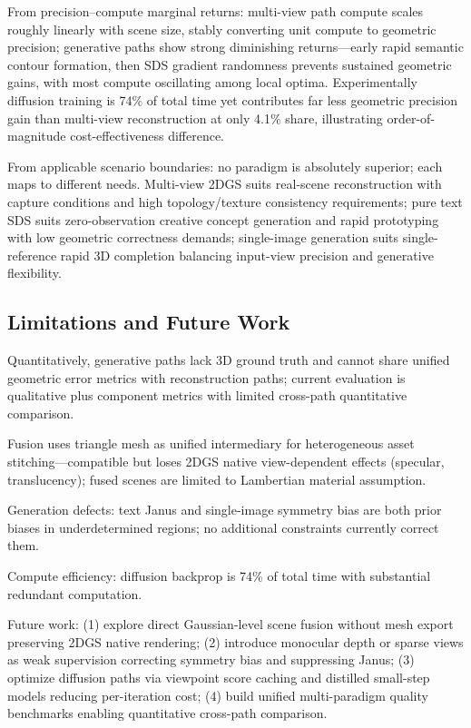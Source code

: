 \documentclass[10pt,twocolumn,letterpaper]{article}
\begin{document}
From precision--compute marginal returns: multi-view path compute scales roughly linearly with scene size, stably converting unit compute to geometric precision; generative paths show strong diminishing returns---early rapid semantic contour formation, then SDS gradient randomness prevents sustained geometric gains, with most compute oscillating among local optima. Experimentally diffusion training is 74\% of total time yet contributes far less geometric precision gain than multi-view reconstruction at only 4.1\% share, illustrating order-of-magnitude cost-effectiveness difference.

From applicable scenario boundaries: no paradigm is absolutely superior; each maps to different needs. Multi-view 2DGS suits real-scene reconstruction with capture conditions and high topology/texture consistency requirements; pure text SDS suits zero-observation creative concept generation and rapid prototyping with low geometric correctness demands; single-image generation suits single-reference rapid 3D completion balancing input-view precision and generative flexibility.

\subsection{Limitations and Future Work}

Quantitatively, generative paths lack 3D ground truth and cannot share unified geometric error metrics with reconstruction paths; current evaluation is qualitative plus component metrics with limited cross-path quantitative comparison.

Fusion uses triangle mesh as unified intermediary for heterogeneous asset stitching---compatible but loses 2DGS native view-dependent effects (specular, translucency); fused scenes are limited to Lambertian material assumption.

Generation defects: text Janus and single-image symmetry bias are both prior biases in underdetermined regions; no additional constraints currently correct them.

Compute efficiency: diffusion backprop is 74\% of total time with substantial redundant computation.

Future work: (1) explore direct Gaussian-level scene fusion without mesh export preserving 2DGS native rendering; (2) introduce monocular depth or sparse views as weak supervision correcting symmetry bias and suppressing Janus; (3) optimize diffusion paths via viewpoint score caching and distilled small-step models reducing per-iteration cost; (4) build unified multi-paradigm quality benchmarks enabling quantitative cross-path comparison.
\end{document}
